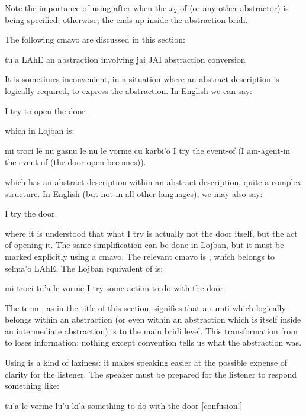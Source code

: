 Note the importance of using  after  when the
    $x_2$ of  (or any other abstractor) is being specified;
    otherwise, the  ends up inside the abstraction
    bridi.



The following cmavo are discussed in this section:

   tu'a    LAhE    an abstraction involving
    jai JAI abstraction conversion

It is sometimes inconvenient, in a situation where an abstract
    description is logically required, to express the abstraction.
    In English we can say:
\begin{example}
I try to open the door.
\end{example}

{\noindent}which in Lojban is:
\begin{example}
mi troci le nu\n
\T	{} gasnu le nu\n
\T	le vorme cu karbi'o\n
I try the event-of\n
\T	(I am-agent-in the event-of\n
\T	(the door open-becomes)).
\end{example}

{\noindent}which has an abstract description within an abstract
    description, quite a complex structure. In English (but not in
    all other languages), we may also say:
\begin{example}
I try the door.
\end{example}

{\noindent}where it is understood that what I try is actually not the door
    itself, but the act of opening it. The same simplification can
    be done in Lojban, but it must be marked explicitly using a
    cmavo. The relevant cmavo is , which belongs to selma'o
    LAhE. The Lojban equivalent of  is:
\begin{example}
mi troci tu'a le vorme\n
I try some-action-to-do-with the door.
\end{example}

The term , as in the title of this section,
    signifies that a sumti which logically belongs within an
    abstraction (or even within an abstraction which is itself
    inside an intermediate abstraction) is  to the main
    bridi level. This transformation from  to  loses
    information: nothing except convention tells us what the
    abstraction was. 

Using  is a kind of laziness: it makes speaking
    easier at the possible expense of clarity for the listener. The
    speaker must be prepared for the listener to respond something
    like:
\begin{example}
tu'a le vorme lu'u ki'a\n
something-to-do-with the door  [confusion!]
\end{example}


